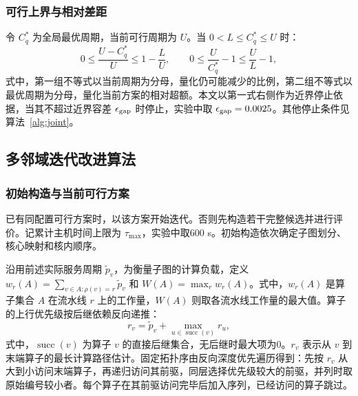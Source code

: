 \subsubsection{可行上界与相对差距}
令 $C_q^*$ 为全局最优周期，当前可行周期为 $U$。当 $0<L\le C_q^*\le U$ 时：
\begin{equation}
 0\le\frac{U-C_q^*}{U}\le1-\frac{L}{U},\qquad
 0\le\frac{U}{C_q^*}-1\le\frac{U}{L}-1,
 \label{eq:gap}
\end{equation}
\noindent 式中，第一组不等式以当前周期为分母，量化仍可能减少的比例，第二组不等式以最优周期为分母，量化当前方案的相对超额。本文以第一式右侧作为近界停止依据，当其不超过近界容差 $\epsilon_{\rm gap}$ 时停止，实验中取 $\epsilon_{\rm gap}=0.0025$。其他停止条件见算法~\ref{alg:joint}。

\subsection{多邻域迭代改进算法}
\subsubsection{初始构造与当前可行方案}
已有同配置可行方案时，以该方案开始迭代。否则先构造若干完整候选并进行评价。记累计主机时间上限为 $\tau_{\max}$，实验中取600 s。初始构造依次确定子图划分、核心映射和核内顺序。

沿用前述实际服务周期 $\widetilde p_v$，为衡量子图的计算负载，定义 $w_r(A)=\sum_{v\in A:\rho(v)=r}\widetilde p_v$ 和 $W(A)=\max_r w_r(A)$。式中，$w_r(A)$ 是算子集合 $A$ 在流水线 $r$ 上的工作量，$W(A)$ 则取各流水线工作量的最大值。算子的上行优先级按后继依赖反向递推：
\begin{equation}
 r_v=\widetilde p_v+\max_{u\in\operatorname{succ}(v)}r_u,
 \label{eq:upward_priority}
\end{equation}
\noindent 式中，$\operatorname{succ}(v)$ 为算子 $v$ 的直接后继集合，无后继时最大项为0。$r_v$ 表示从 $v$ 到末端算子的最长计算路径估计。固定拓扑序由反向深度优先遍历得到：先按 $r_v$ 从大到小访问末端算子，再递归访问其前驱，同层选择优先级较大的前驱，并列时取原始编号较小者。每个算子在其前驱访问完毕后加入序列，已经访问的算子跳过。

